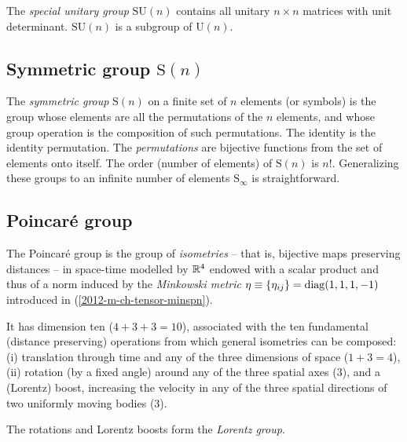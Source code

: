 The {\em special unitary group} $\textrm{SU}(n)$
contains all  unitary
$n\times n$ matrices with unit determinant.
$\textrm{SU}(n)$ is a subgroup of $\textrm{U}(n)$.

\subsection{Symmetric group $\textrm{S}(n)$}

The {\em symmetric group}
  $\textrm{S}(n)$ on a finite set of $n$ elements (or symbols)
is the group whose elements are all the permutations of the $n$ elements,
and whose group operation is the composition of such permutations.
The identity is the identity permutation.
The {\em permutations} are bijective functions from the set of elements onto itself.
The order (number of elements) of $\textrm{S}(n)$ is $n!$.
Generalizing these groups to an infinite number of elements $\textrm{S}_\infty$ is straightforward.



\subsection{Poincar\'e group}


The {Poincar\'e group} is the group of {\em isometries}
--
that is,
bijective maps preserving distances
--
in space-time modelled by ${\Bbb R}^4$
endowed with a scalar product and thus
of a norm induced by the
{\em Minkowski metric}
$
\eta \equiv \{\eta_{ij}\}={\rm diag} (1,1,1,-1)
$
introduced in (\ref{2012-m-ch-tensor-minspn}).

It has dimension ten ($4+3+3=10$), associated with
the ten fundamental (distance preserving) operations
from which general isometries can be composed:
(i) translation through time and any of the three dimensions of space ($1+3=4$),
(ii) rotation (by a fixed angle) around any of the three spatial axes ($3$),
and a (Lorentz) boost, increasing the velocity
in any of the three spatial directions
of two uniformly moving bodies ($3$).

The rotations and Lorentz boosts form the
{\em  Lorentz group}.

















\begin{center}
{\color{olive}   \Huge
 \decosix
}
\end{center}
